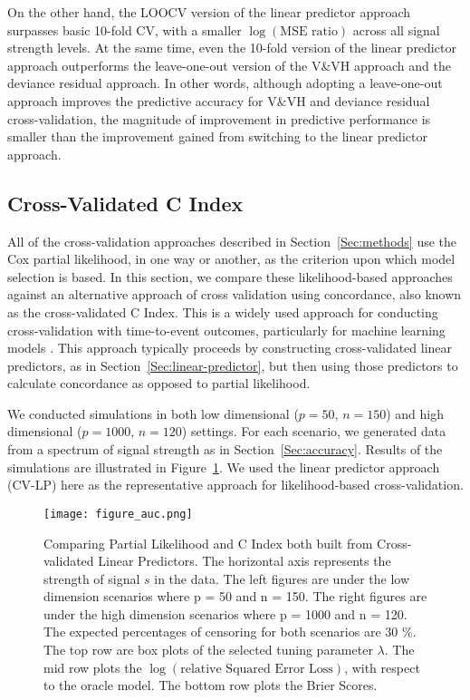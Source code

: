 On the other hand, the LOOCV version of the linear predictor approach surpasses basic 10-fold CV, with a smaller $\log(\text{MSE ratio})$ across all signal strength levels. At the same time, even the 10-fold version of the linear predictor approach outperforms the leave-one-out version of the V$\&$VH approach and the deviance residual approach. In other words, although adopting a leave-one-out approach improves the predictive accuracy for V$\&$VH and deviance residual cross-validation, the magnitude of improvement in predictive performance is smaller than the improvement gained from switching to the linear predictor approach.

\subsection {Cross-Validated C Index}
\label{Sec:CIndex}

\par All of the cross-validation approaches described in Section~\ref{Sec:methods} use the Cox partial likelihood, in one way or another, as the criterion upon which model selection is based.  In this section, we compare these likelihood-based approaches against an alternative approach of cross validation using concordance, also known as the cross-validated C Index.  This is a widely used approach for conducting cross-validation with time-to-event outcomes, particularly for machine learning models \citep{Subramanian2011,Simon2011a}. This approach typically proceeds by constructing cross-validated linear predictors, as in Section~\ref{Sec:linear-predictor}, but then using those predictors to calculate concordance as opposed to partial likelihood.

\par We conducted simulations in both low dimensional ($p = 50$, $n = 150$) and high dimensional ($p = 1000$, $n = 120$) settings. For each scenario, we generated data from a spectrum of signal strength as in Section~\ref{Sec:accuracy}. Results of the simulations are illustrated in Figure~\ref{Fig:cvauc}.  We used the linear predictor approach (CV-LP) here as the representative approach for likelihood-based cross-validation.

\begin{figure}[!htb]
  \centering
  \texttt{[image: figure\_auc.png]}
  \caption{\label{Fig:cvauc}Comparing Partial Likelihood and C Index both built from Cross-validated Linear Predictors. The horizontal axis represents the strength of signal $s$ in the data. The left figures are under the low dimension scenarios where p = 50 and n = 150. The right figures are under the high dimension scenarios where p = 1000 and n = 120. The expected percentages of censoring for both scenarios are 30 $\%$. The top row are box plots of the selected tuning parameter $\lambda$. The mid row plots the $\log(\text{relative Squared Error Loss})$, with respect to the oracle model. The bottom row plots the Brier Scores. }
\end{figure}

